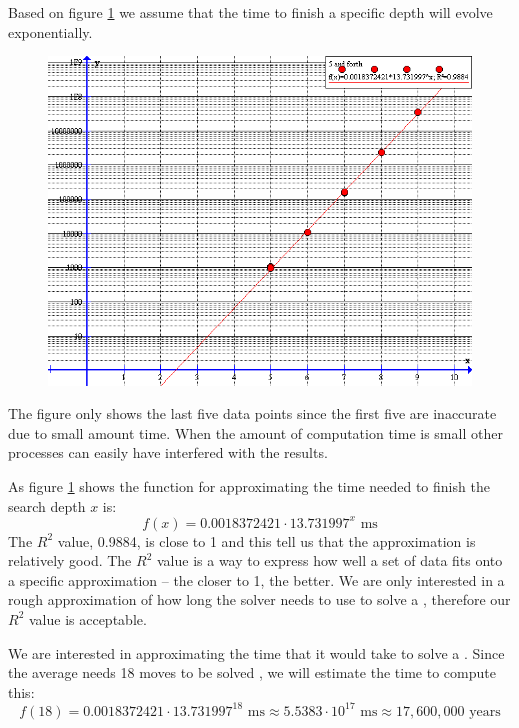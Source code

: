 Based on figure \ref{fig:timeFunction} we assume that the time to finish a specific depth will evolve exponentially.

\begin{figure}[ht]
	\centering
		\includegraphics[scale=0.5]{input/pics/timeFunction}
	\caption{}
	\label{fig:timeFunction}
\end{figure}

The figure only shows the last five data points since the first five are inaccurate due to small amount time.
When the amount of computation time is small other processes can easily have interfered with the results. 


As figure \ref{fig:timeFunction} shows the function for approximating the time needed to finish the search depth $x$ is:
\[
f(x)=0.0018372421 \cdot 13.731997^{x} \text{ ms}
\]
The $R^2$ value, 0.9884, is close to 1 and this tell us that the approximation is relatively good. 
The $R^2$ value is a way to express how well a set of data fits onto a specific approximation -- the closer to 1, the better. 
We are only interested in a rough approximation of how long the solver needs to use to solve a \rubik{}, therefore our $R^2$ value is acceptable.

We are interested in approximating the time that it would take to solve a \rubik{}. Since the average \rubik{} needs 18 moves to be solved \cite{kociemba09}, we will estimate the time to compute this:
\[
f(18) = 0.0018372421 \cdot 13.731997^{18} \text{ ms} \approx 5.5383 \cdot 10^{17} \text{ ms} \approx 17,600,000 \text{ years}
\]

